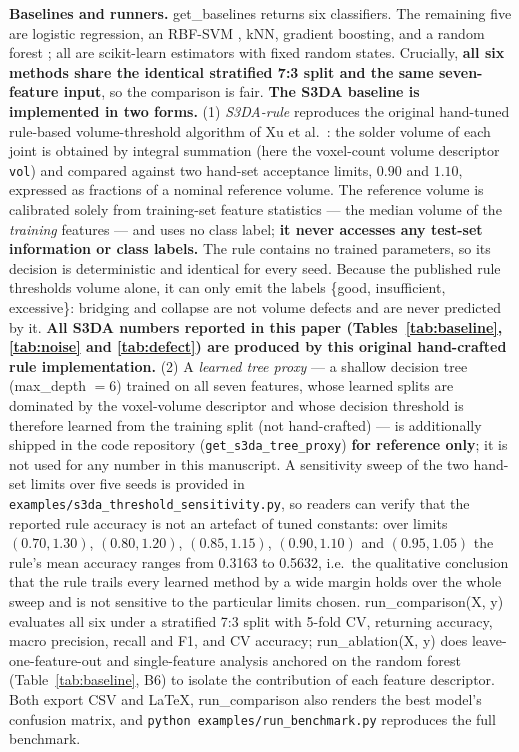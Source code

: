 \documentclass[3p]{elsarticle}
\begin{document}
\textbf{Baselines and runners. }get\_baselines returns six classifiers. The remaining five are logistic regression, an RBF-SVM \cite{ref12}, kNN, gradient boosting, and a random forest \cite{ref11}; all are scikit-learn estimators \cite{ref13} with fixed random states. Crucially, \textbf{all six methods share the identical stratified 7:3 split and the same seven-feature input}, so the comparison is fair. \textbf{The S3DA baseline \cite{ref6} is implemented in two forms.} (1) \emph{S3DA-rule} reproduces the original hand-tuned rule-based volume-threshold algorithm of Xu et al.\ \cite{ref6}: the solder volume of each joint is obtained by integral summation (here the voxel-count volume descriptor \texttt{vol}) and compared against two hand-set acceptance limits, $0.90$ and $1.10$, expressed as fractions of a nominal reference volume. The reference volume is calibrated solely from training-set feature statistics --- the median volume of the \emph{training} features --- and uses no class label; \textbf{it never accesses any test-set information or class labels.} The rule contains no trained parameters, so its decision is deterministic and identical for every seed. Because the published rule thresholds volume alone, it can only emit the labels \{good, insufficient, excessive\}: bridging and collapse are not volume defects and are never predicted by it. \textbf{All S3DA numbers reported in this paper (Tables~\ref{tab:baseline}, \ref{tab:noise} and \ref{tab:defect}) are produced by this original hand-crafted rule implementation.} (2) A \emph{learned tree proxy} --- a shallow decision tree (max\_depth $=6$) trained on all seven features, whose learned splits are dominated by the voxel-volume descriptor and whose decision threshold is therefore learned from the training split (not hand-crafted) --- is additionally shipped in the code repository (\texttt{get\_s3da\_tree\_proxy}) \textbf{for reference only}; it is not used for any number in this manuscript. A sensitivity sweep of the two hand-set limits over five seeds is provided in \texttt{examples/s3da\_threshold\_sensitivity.py}, so readers can verify that the reported rule accuracy is not an artefact of tuned constants: over limits $(0.70,1.30)$, $(0.80,1.20)$, $(0.85,1.15)$, $(0.90,1.10)$ and $(0.95,1.05)$ the rule's mean accuracy ranges from 0.3163 to 0.5632, i.e.\ the qualitative conclusion that the rule trails every learned method by a wide margin holds over the whole sweep and is not sensitive to the particular limits chosen. run\_comparison(X, y) evaluates all six under a stratified 7:3 split with 5-fold CV, returning accuracy, macro precision, recall and F1, and CV accuracy; run\_ablation(X, y) does leave-one-feature-out and single-feature analysis anchored on the random forest (Table~\ref{tab:baseline}, B6) to isolate the contribution of each feature descriptor. Both export CSV and LaTeX, run\_comparison also renders the best model's confusion matrix, and \texttt{python examples/run\_benchmark.py} reproduces the full benchmark.
\end{document}
